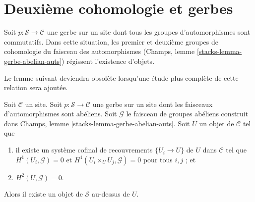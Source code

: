 \section{Deuxième cohomologie et gerbes}
\label{section-gerbes}

\noindent
Soit $p : \mathcal{S} \to \mathcal{C}$ une gerbe sur un site dont tous les
groupes d'automorphismes sont commutatifs. Dans cette situation, les premier
et deuxième groupes de cohomologie du faisceau des automorphismes (Champs,
lemme \ref{stacks-lemma-gerbe-abelian-auts}) régissent l'existence d'objets.

\medskip\noindent
Le lemme suivant deviendra obsolète lorsqu'une étude plus complète de cette
relation sera ajoutée.

\begin{lemma}
\label{lemma-existence}
Soit $\mathcal{C}$ un site. Soit $p : \mathcal{S} \to \mathcal{C}$ une gerbe
sur un site dont les faisceaux d'automorphismes sont abéliens.
Soit $\mathcal{G}$ le faisceau de groupes abéliens construit dans Champs,
lemme \ref{stacks-lemma-gerbe-abelian-auts}.
Soit $U$ un objet de $\mathcal{C}$ tel que
\begin{enumerate}
\item il existe un système cofinal de recouvrements $\{U_i \to U\}$ de $U$
dans $\mathcal{C}$ tel que $H^1(U_i, \mathcal{G}) = 0$ et
$H^1(U_i \times_U U_j, \mathcal{G}) = 0$
pour tous $i, j$ ; et
\item $H^2(U, \mathcal{G}) = 0$.
\end{enumerate}
Alors il existe un objet de $\mathcal{S}$ au-dessus de $U$.
\end{lemma}

